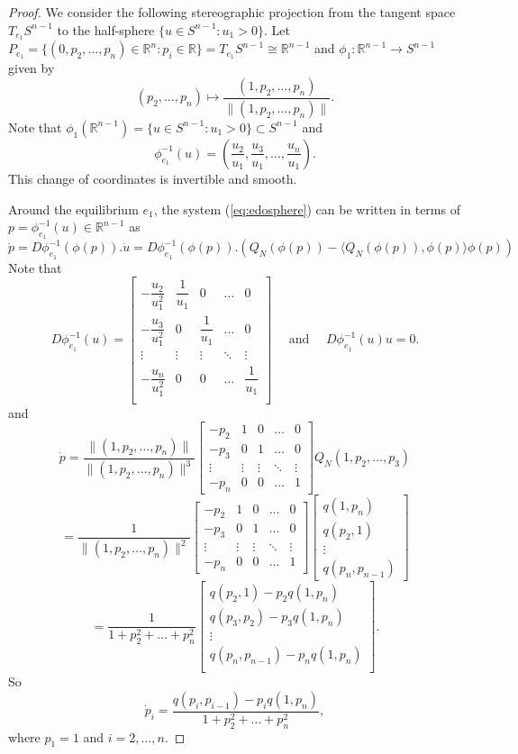 \documentclass[10pt,a4paper]{amsart}
\begin{document}
\begin{proof}

We consider the following stereographic projection from the tangent space $T_{e_1}S^{n-1}$ to the half-sphere $\{u\in S^{n-1}:u_1>0 \}$.
Let $P_{e_1}=\{(0,p_2,\dots,p_n)\in \mathbb{R}^n:p_i\in\mathbb{R}\}=T_{e_1}S^{n-1}\cong \mathbb{R}^{n-1}$ and $\phi_{1}:\mathbb{R}^{n-1}\rightarrow S^{n-1}$ given by
$$ (p_2,\dots,p_n)\mapsto \dfrac{(1,p_2,\dots,p_n)}{\|(1,p_2,\dots,p_n)\|}.$$
Note that $\phi_{1}(\mathbb{R}^{n-1})=\{u\in S^{n-1}:u_1>0 \}\subset S^{n-1}$ and 
$$\phi^{-1}_{e_1}(u)=(\dfrac{u_2}{u_1},\dfrac{u_3}{u_1},\dots, \dfrac{u_n}{u_1}).$$
This change of coordinates is invertible and smooth.

Around the equilibrium $e_1$, the system (\ref{eq:edosphere}) can be written in terms of $p=\phi^{-1}_{e_1}(u)\in \mathbb{R}^{n-1}$ as
$$\dot{p}=  D \phi^{-1}_{e_1}(\phi(p)).\dot{u}=D \phi^{-1}_{e_1}(\phi(p)).(Q_N(\phi(p))-\langle Q_N(\phi(p)),\phi(p)\rangle \phi(p))$$
Note that 
$$D \phi^{-1}_{e_1}(u)=\begin{bmatrix}
-\dfrac{u_2}{u_1^2}& \dfrac{1}{u_1}&0&\dots &0\\
-\dfrac{u_3}{u_1^2}& 0&\dfrac{1}{u_1}&\dots &0\\
\vdots& \vdots& \vdots& \ddots& \vdots\\
-\dfrac{u_n}{u_1^2}& 0&0&\dots &\dfrac{1}{u_1}\\
\end{bmatrix}\quad \textrm{ and }\quad D\phi^{-1}_{e_1}(u) u=0.$$
and 
$$\dot{p}= \dfrac{\|(1,p_2,\dots, p_n)\|}{\|(1,p_2,\dots, p_n)\|^3}\begin{bmatrix}
-p_2& 1 &0&\dots &0\\
-p_3& 0&1&\dots &0\\
\vdots& \vdots& \vdots& \ddots& \vdots\\
-p_n & 0&0&\dots &1
\end{bmatrix}Q_N(1,p_2,\dots,p_3)$$
$$=
\dfrac{1}{\|(1,p_2,\dots, p_n)\|^2}\begin{bmatrix}
-p_2& 1 &0&\dots &0\\
-p_3& 0&1&\dots &0\\
\vdots& \vdots& \vdots& \ddots& \vdots\\
-p_n & 0&0&\dots &1
\end{bmatrix}\begin{bmatrix}
q(1,p_n)\\
q(p_2,1)\\
\vdots\\
q(p_n,p_{n-1})
\end{bmatrix}
$$
$$
=\dfrac{1}{1+p_2^2+\dots +p_n^2}\begin{bmatrix}
q(p_2,1)-p_2q(1,p_n)\\
q(p_3,p_2)-p_3q(1,p_n)\\
\vdots\\
q(p_n,p_{n-1})-p_n q(1,p_n)\\
\end{bmatrix}.$$
So $$\dot{p}_i=\dfrac{q(p_i,p_{i-1})-p_i q(1,p_n)}{1+p_2^2+\dots +p_n^2},$$
where $p_1=1$ and $i=2,\dots,n$.


\end{proof}
\end{document}
